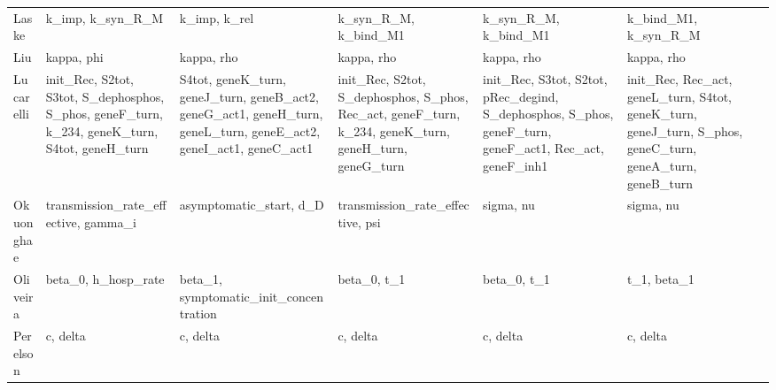 \begin{longtable}{@{}l>{\raggedright}p{2.6cm}>{\raggedright}p{2.6cm}>{\raggedright}p{2.6cm}>{\raggedright}p{2.6cm}>{\raggedright\arraybackslash}p{2.6cm}@{}}
Laske & k\_\allowbreak{}imp, k\_\allowbreak{}syn\_\allowbreak{}R\_\allowbreak{}M & k\_\allowbreak{}imp, k\_\allowbreak{}rel & k\_\allowbreak{}syn\_\allowbreak{}R\_\allowbreak{}M, k\_\allowbreak{}bind\_\allowbreak{}M1 & k\_\allowbreak{}syn\_\allowbreak{}R\_\allowbreak{}M, k\_\allowbreak{}bind\_\allowbreak{}M1 & k\_\allowbreak{}bind\_\allowbreak{}M1, k\_\allowbreak{}syn\_\allowbreak{}R\_\allowbreak{}M \\
Liu & kappa, phi & kappa, rho & kappa, rho & kappa, rho & kappa, rho \\
Lucarelli & init\_\allowbreak{}Rec, S2tot, S3tot, S\_\allowbreak{}dephosphos, S\_\allowbreak{}phos, geneF\_\allowbreak{}turn, k\_\allowbreak{}234, geneK\_\allowbreak{}turn, S4tot, geneH\_\allowbreak{}turn & S4tot, geneK\_\allowbreak{}turn, geneJ\_\allowbreak{}turn, geneB\_\allowbreak{}act2, geneG\_\allowbreak{}act1, geneH\_\allowbreak{}turn, geneL\_\allowbreak{}turn, geneE\_\allowbreak{}act2, geneI\_\allowbreak{}act1, geneC\_\allowbreak{}act1 & init\_\allowbreak{}Rec, S2tot, S\_\allowbreak{}dephosphos, S\_\allowbreak{}phos, Rec\_\allowbreak{}act, geneF\_\allowbreak{}turn, k\_\allowbreak{}234, geneK\_\allowbreak{}turn, geneH\_\allowbreak{}turn, geneG\_\allowbreak{}turn & init\_\allowbreak{}Rec, S3tot, S2tot, pRec\_\allowbreak{}degind, S\_\allowbreak{}dephosphos, S\_\allowbreak{}phos, geneF\_\allowbreak{}turn, geneF\_\allowbreak{}act1, Rec\_\allowbreak{}act, geneF\_\allowbreak{}inh1 & init\_\allowbreak{}Rec, Rec\_\allowbreak{}act, geneL\_\allowbreak{}turn, S4tot, geneK\_\allowbreak{}turn, geneJ\_\allowbreak{}turn, S\_\allowbreak{}phos, geneC\_\allowbreak{}turn, geneA\_\allowbreak{}turn, geneB\_\allowbreak{}turn \\
Okuonghae & transmission\_\allowbreak{}rate\_\allowbreak{}effective, gamma\_\allowbreak{}i & asymptomatic\_\allowbreak{}start, d\_\allowbreak{}D & transmission\_\allowbreak{}rate\_\allowbreak{}effective, psi & sigma, nu & sigma, nu \\
Oliveira & beta\_\allowbreak{}0, h\_\allowbreak{}hosp\_\allowbreak{}rate & beta\_\allowbreak{}1, symptomatic\_\allowbreak{}init\_\allowbreak{}concentration & beta\_\allowbreak{}0, t\_\allowbreak{}1 & beta\_\allowbreak{}0, t\_\allowbreak{}1 & t\_\allowbreak{}1, beta\_\allowbreak{}1 \\
Perelson & c, delta & c, delta & c, delta & c, delta & c, delta \\

\end{longtable}
